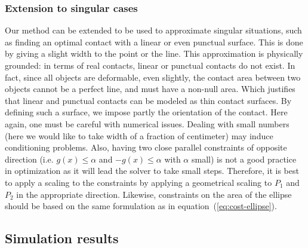 \subsubsection{Extension to singular cases}
\label{subsubsec:singular_cases}
Our method can be extended to be used to approximate singular situations, such as finding an optimal contact with a linear or even punctual surface.
This is done by giving a slight width to the point or the line.
This approximation is physically grounded:
in terms of real contacts, linear or punctual contacts do not exist.
In fact, since all objects are deformable, even slightly, the contact area between two objects cannot be a perfect line, and must have a non-null area.
Which justifies that linear and punctual contacts can be modeled as thin contact surfaces.
By defining such a surface, we impose partly the orientation of the contact.
Here again, one must be careful with numerical issues.
Dealing with small numbers (here we would like to take width of a fraction of centimeter) may induce conditioning problems.
Also, having two close parallel constraints of opposite direction (i.e. $g(x)\leq \alpha$ and  $-g(x)\leq \alpha$ with $\alpha$ small) is not a good practice in optimization as it will lead the solver to take small steps.
Therefore, it is best to apply a scaling to the constraints by applying a geometrical scaling to $P_1$ and $P_2$ in the appropriate direction.\newline
Likewise, constraints on the area of the ellipse should be based on the same formulation as in equation~(\ref{eq:cost-ellipse}).



\subsection{Simulation results}
\label{subsec:simu}

